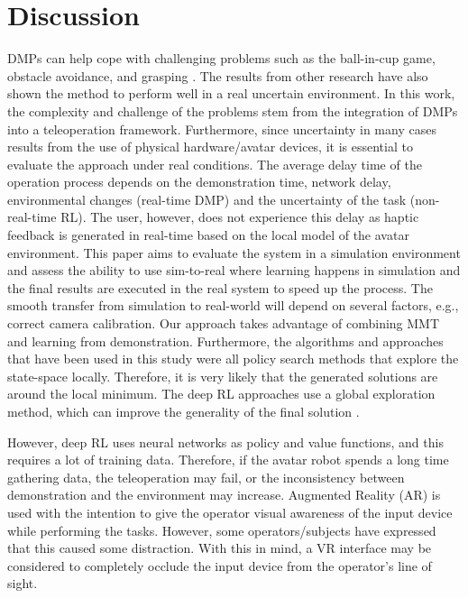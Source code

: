\documentclass[letterpaper, 10 pt, conference]{ieeeconf}  %
\begin{document}
\section{Discussion}
\label{section:discussion}
DMPs can help cope with challenging problems such as the ball-in-cup game, obstacle avoidance, and grasping \cite{mastersthesis1, 4755937, MATSUBARA2011493}. The results from other research \cite{freekpi2} have also shown the method to perform well in a real uncertain environment. In this work, the complexity and challenge of the problems stem from the integration of DMPs into a teleoperation framework. Furthermore, since uncertainty in many cases results from the use of physical hardware/avatar devices, it is essential to evaluate the approach under real conditions. %
The average delay time of the operation process depends on the demonstration time, network delay, environmental changes (real-time DMP) and the uncertainty of the task (non-real-time RL). The user, however, does not experience this delay as haptic feedback is generated in real-time based on the local model of the avatar environment.
This paper aims to evaluate the system in a simulation environment and assess the ability to use sim-to-real where learning happens in simulation and the final results are executed in the real system to speed up the process. The smooth transfer from simulation to real-world will depend on several factors, e.g., correct camera calibration. Our approach takes advantage of combining MMT and learning from demonstration.
Furthermore, the algorithms and approaches that have been used in this study were all policy search methods that explore the state-space locally. Therefore, it is very likely that the generated solutions are around the local minimum. The deep RL approaches use a global exploration method, which can improve the generality of the final solution \cite{Hadi_ICANN, Matthias_IJCNN}. 

\noindent
However, deep RL uses neural networks as policy and value functions, and this requires a lot of training data. Therefore, if the avatar robot spends a long time gathering data, the teleoperation may fail, or the inconsistency between demonstration and the environment may increase. Augmented Reality (AR) is used with the intention to give the operator visual awareness of the input device while performing the tasks. However, some operators/subjects have expressed that this caused some distraction. With this in mind, a VR interface may be considered to completely occlude the input device from the operator's line of sight. 
\end{document}

